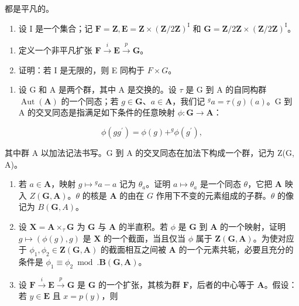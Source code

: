 都是平凡的。

\begin{enumerate}
\def\labelenumi{\arabic{enumi}。}
\setcounter{enumi}{5}
\tightlist
\item
  设 I 是一个集合；记 \(\mathbf{F} = \mathbf{Z}, \mathbf{E} = \mathbf{Z} \times (\mathbf{Z}/2\mathbf{Z})^{\mathrm{I}}\) 和 \(\mathbf{G} = \mathbf{Z}/2\mathbf{Z} \times (\mathbf{Z}/2\mathbf{Z})^{\mathrm{I}}\)。
\end{enumerate}

\begin{enumerate}
\def\labelenumi{(\alph{enumi})}
\item
  定义一个非平凡扩张 \(\mathbf{F} \xrightarrow{i} \mathbf{E} \xrightarrow{p} \mathbf{G}\)。
\item
  证明：若 I 是无限的，则 E 同构于 \(F \times G\)。
\end{enumerate}

\begin{enumerate}
\def\labelenumi{\arabic{enumi}。}
\setcounter{enumi}{6}
\tightlist
\item
  设 G 和 A 是两个群，其中 A 是交换的。设 \(\tau\) 是 G 到 A 的自同构群 \(\operatorname{Aut}(\mathbf{A})\) 的一个同态；若 \(g \in \mathbf{G}\)、\(a \in \mathbf{A}\)，我们记 \(^g a = \tau(g)(a)\)。G 到 A 的交叉同态是指满足如下条件的任意映射 \(\phi: \mathbf{G} \to \mathbf{A}\)：
\end{enumerate}

\[
\phi (g g ^ {\prime}) = \phi (g) + ^ {g} \phi (g ^ {\prime}),
\]

其中群 A 以加法记法书写。G 到 A 的交叉同态在加法下构成一个群，记为 Z(G, A)。

\begin{enumerate}
\def\labelenumi{(\alph{enumi})}
\item
  若 \(a \in \mathbf{A}\)，映射 \(g \mapsto {}^g a - a\) 记为 \(\theta_a\)。证明 \(a \mapsto \theta_a\) 是一个同态 \(\theta\)，它把 \(\mathbf{A}\) 映入 \(Z(\mathbf{G}, \mathbf{A})\)。\(\theta\) 的核是 \(\mathbf{A}\) 的由在 \(G\) 作用下不变的元素组成的子群。\(\theta\) 的像记为 \(B(\mathbf{G}, A)\)。
\item
  设 \(\mathbf{X} = \mathbf{A} \times_{\tau} \mathbf{G}\) 为 \(\mathbf{G}\) 与 \(\mathbf{A}\) 的半直积。若 \(\phi\) 是 \(\mathbf{G}\) 到 \(\mathbf{A}\) 的一个映射，证明 \(g \mapsto (\phi(g), g)\) 是 \(\mathbf{X}\) 的一个截面，当且仅当 \(\phi\) 属于 \(\mathbf{Z}(\mathbf{G}, \mathbf{A})\)。为使对应于 \(\phi_1, \phi_2 \in \mathbf{Z}(\mathbf{G}, \mathbf{A})\) 的截面相互之间被 \(\mathbf{A}\) 的一个元素共轭，必要且充分的条件是 \(\phi_1 \equiv \phi_2 \bmod. \mathbf{B}(\mathbf{G}, \mathbf{A})\)。
\item
  设 \(\mathbf{F} \xrightarrow{i} \mathbf{E} \xrightarrow{p} \mathbf{G}\) 是 \(\mathbf{G}\) 的一个扩张，其核为群 \(\mathbf{F}\)，后者的中心等于 \(\mathbf{A}\)。假设：若 \(y \in \mathbf{E}\) 且 \(x = p(y)\)，则
\end{enumerate}

